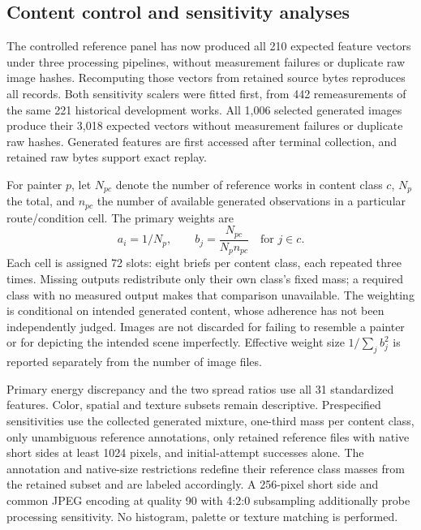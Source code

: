 \documentclass[11pt]{article}
\begin{document}
\subsection{Content control and sensitivity analyses}
The controlled reference panel has now produced all 210 expected feature vectors
under three processing pipelines, without measurement failures or duplicate raw
image hashes. Recomputing those vectors from retained source bytes reproduces
all records. Both sensitivity scalers were fitted first, from 442 remeasurements
of the same 221 historical development works. All 1,006 selected generated images produce their 3,018 expected vectors without
measurement failures or duplicate raw hashes. Generated features are first
accessed after terminal collection, and retained raw bytes support exact replay.

For painter $p$, let $N_{pc}$ denote the number of reference works in content
class $c$, $N_p$ the total, and $n_{pc}$ the number of available generated
observations in a particular route/condition cell. The primary weights are
\begin{equation}
 a_i=1/N_p,\qquad b_j=\frac{N_{pc}}{N_p n_{pc}}\quad\text{for }j\in c.
\end{equation}
Each cell is assigned 72 slots: eight briefs per content class, each repeated
three times. Missing outputs redistribute only their own class's fixed mass;
a required class with no measured output makes that comparison unavailable.
The weighting is conditional on intended generated content, whose adherence has
not been independently judged. Images are not discarded for failing to resemble
a painter or for depicting the intended scene imperfectly. Effective weight size
$1/\sum_j b_j^2$ is reported separately from the number of image files.

Primary energy discrepancy and the two spread ratios use all 31 standardized
features. Color, spatial and texture subsets remain descriptive. Prespecified
sensitivities use the collected generated mixture, one-third mass per content
class, only unambiguous reference annotations, only retained reference files with native
short sides at least 1024 pixels, and initial-attempt successes alone. The
annotation and native-size restrictions redefine their reference class masses
from the retained subset and are labeled accordingly. A 256-pixel short side
and common JPEG encoding at quality 90 with 4:2:0 subsampling additionally probe
processing sensitivity. No histogram, palette or texture matching is performed.
\end{document}
